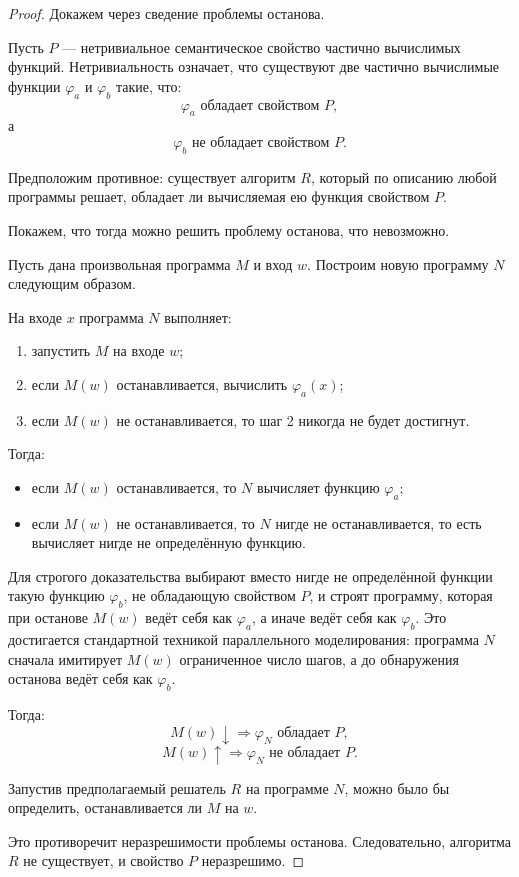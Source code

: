 \documentclass[12pt,a4paper]{article}
\begin{document}
\begin{proof}
Докажем через сведение проблемы останова.

Пусть $P$ --- нетривиальное семантическое свойство частично вычислимых функций. Нетривиальность означает, что существуют две частично вычислимые функции $\varphi_a$ и $\varphi_b$ такие, что:
\[
\varphi_a \text{ обладает свойством } P,
\]
а
\[
\varphi_b \text{ не обладает свойством } P.
\]

Предположим противное: существует алгоритм $R$, который по описанию любой программы решает, обладает ли вычисляемая ею функция свойством $P$.

Покажем, что тогда можно решить проблему останова, что невозможно.

Пусть дана произвольная программа $M$ и вход $w$. Построим новую программу $N$ следующим образом.

На входе $x$ программа $N$ выполняет:

\begin{enumerate}
  \item запустить $M$ на входе $w$;
  \item если $M(w)$ останавливается, вычислить $\varphi_a(x)$;
  \item если $M(w)$ не останавливается, то шаг 2 никогда не будет достигнут.
\end{enumerate}

Тогда:

\begin{itemize}
  \item если $M(w)$ останавливается, то $N$ вычисляет функцию $\varphi_a$;
  \item если $M(w)$ не останавливается, то $N$ нигде не останавливается, то есть вычисляет нигде не определённую функцию.
\end{itemize}

Для строгого доказательства выбирают вместо нигде не определённой функции такую функцию $\varphi_b$, не обладающую свойством $P$, и строят программу, которая при останове $M(w)$ ведёт себя как $\varphi_a$, а иначе ведёт себя как $\varphi_b$. Это достигается стандартной техникой параллельного моделирования: программа $N$ сначала имитирует $M(w)$ ограниченное число шагов, а до обнаружения останова ведёт себя как $\varphi_b$.

Тогда:
\[
M(w) \downarrow \Rightarrow \varphi_N \text{ обладает } P,
\]
\[
M(w) \uparrow \Rightarrow \varphi_N \text{ не обладает } P.
\]

Запустив предполагаемый решатель $R$ на программе $N$, можно было бы определить, останавливается ли $M$ на $w$.

Это противоречит неразрешимости проблемы останова. Следовательно, алгоритма $R$ не существует, и свойство $P$ неразрешимо.
\end{proof}
\end{document}
